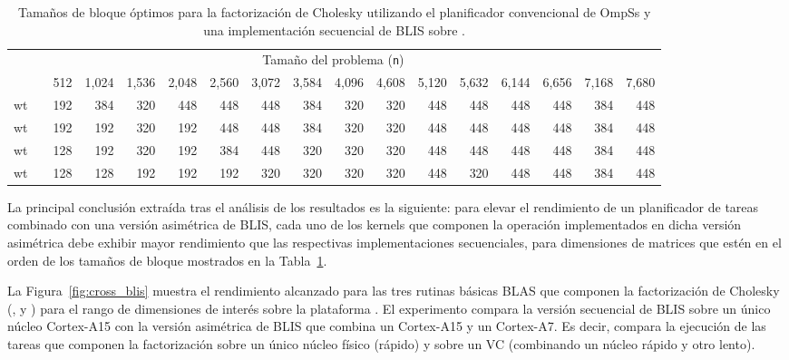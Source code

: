 \newcommand{\ra}[1]{\renewcommand{\arraystretch}{#1}}
\newcommand{\ca}[1]{\renewcommand{\tabcolsep}{#1}}

\ra{1.2}
\ca{2pt}

\begin{table}
	\centering
	\caption{Tamaños de bloque óptimos para la factorización de Cholesky utilizando el planificador convencional
	         de OmpSs y una implementación secuencial de BLIS sobre \odroid.}
	\label{tab:optimal_bs_sym}
{\scriptsize
\begin{tabular}{crrrrrrrrrrrrrrrr} 
\toprule
  & \phantom{a} & \multicolumn{14}{c}{Tamaño del problema ({\tt n})} \\ 
\cmidrule{3-17} 
  & \phantom{a} &     512 & 1,024 & 1,536 & 2,048 & 2,560 & 3,072 & 3,584 & 4,096 & 4,608 & 5,120 & 5,632 & 6,144 & 6,656 & 7,168 & 7,680 \\ \hline

{\sc 1 wt} & \phantom{a} &     192 & 384  & 320  & 448  & 448  & 448  & 384  & 320 & 320 & 448 & 448 & 448 & 448 & 384 & 448 \\ \hline
{\sc 2 wt} & \phantom{a} &     192 & 192  & 320  & 192  & 448  & 448  & 384  & 320 & 320 & 448 & 448 & 448 & 448 & 384 & 448 \\ \hline
{\sc 3 wt} & \phantom{a} &     128 & 192  & 320  & 192  & 384  & 448  & 320  & 320 & 320 & 448 & 448 & 448 & 448 & 384 & 448 \\ \hline
{\sc 4 wt} & \phantom{a} &     128 & 128  & 192  & 192  & 192  & 320  & 320  & 320 & 320 & 448 & 320 & 448 & 448 & 384 & 448 \\ \bottomrule
\end{tabular}
}
\end{table}

La principal conclusión extraída tras el análisis de los resultados es la siguiente: para elevar el rendimiento de un planificador
de tareas combinado con una versión asimétrica de BLIS, cada uno de los kernels que componen la operación implementados en dicha
versión asimétrica debe exhibir mayor rendimiento que las respectivas implementaciones secuenciales, para dimensiones de matrices 
que estén en el orden de los tamaños de bloque mostrados en la Tabla~\ref{tab:optimal_bs_sym}.  

La Figura~\ref{fig:cross_blis} muestra el rendimiento alcanzado para las tres rutinas básicas BLAS que componen la factorización
de Cholesky (\gemm, \syrk y \trsm) para el rango de dimensiones de interés sobre la plataforma \odroid.  
El experimento compara la versión secuencial de BLIS sobre un único núcleo Cortex-A15 con la versión asimétrica de BLIS
que combina un Cortex-A15 y un Cortex-A7. Es decir, compara la ejecución de las tareas que componen la factorización sobre un
único núcleo físico (rápido) y sobre un VC (combinando un núcleo rápido y otro lento).

